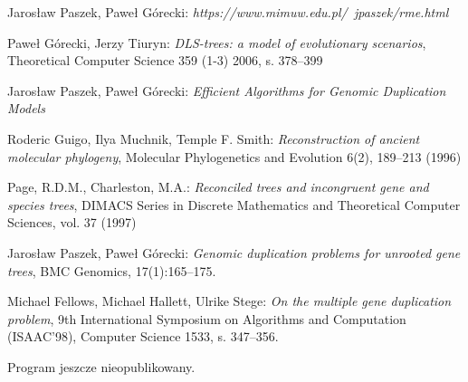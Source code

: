 \documentclass[licencjacka]{pracamgr}
\begin{document}
\begin{thebibliography}{99}

 Jarosław Paszek, Paweł Górecki: \textit{https://www.mimuw.edu.pl/~jpaszek/rme.html}
  
 Paweł Górecki, Jerzy Tiuryn: \textit{DLS-trees: a model of evolutionary scenarios}, Theoretical Computer Science 359 (1-3) 2006, s. 378–399

 Jarosław Paszek, Paweł Górecki: \textit{Efficient Algorithms for Genomic Duplication Models}

Roderic Guigo, Ilya Muchnik, Temple F. Smith: \textit{Reconstruction of ancient molecular phylogeny}, Molecular Phylogenetics and Evolution 6(2), 189–213 (1996)

Page, R.D.M., Charleston, M.A.: \textit{Reconciled trees and incongruent gene and species trees}, DIMACS Series in Discrete Mathematics and Theoretical Computer Sciences, vol. 37 (1997)

 Jarosław Paszek, Paweł Górecki: \textit{Genomic duplication problems for unrooted gene trees}, BMC Genomics, 17(1):165–175.

Michael Fellows, Michael Hallett, Ulrike Stege:  \textit{On the multiple
gene duplication problem}, 9th International Symposium on Algorithms and
Computation (ISAAC’98), Computer Science 1533, s. 347–356.

Program jeszcze nieopublikowany.

\end{thebibliography}
\end{document}

